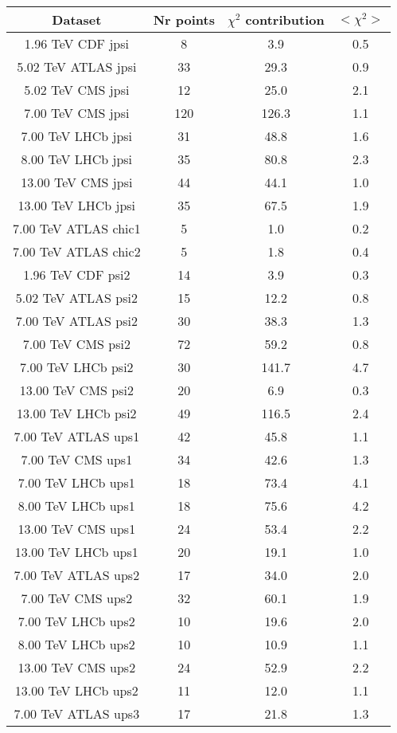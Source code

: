 \begin{table}[h!]
\centering
\begin{tabular}{c|c|c|c}
Dataset & Nr points & $\chi^2$ contribution & $<\chi^2>$ \\
\hline
1.96 TeV CDF jpsi & 8 & 3.9 & 0.5 \\
5.02 TeV ATLAS jpsi & 33 & 29.3 & 0.9 \\
5.02 TeV CMS jpsi & 12 & 25.0 & 2.1 \\
7.00 TeV CMS jpsi & 120 & 126.3 & 1.1 \\
7.00 TeV LHCb jpsi & 31 & 48.8 & 1.6 \\
8.00 TeV LHCb jpsi & 35 & 80.8 & 2.3 \\
13.00 TeV CMS jpsi & 44 & 44.1 & 1.0 \\
13.00 TeV LHCb jpsi & 35 & 67.5 & 1.9 \\
7.00 TeV ATLAS chic1 & 5 & 1.0 & 0.2 \\
7.00 TeV ATLAS chic2 & 5 & 1.8 & 0.4 \\
1.96 TeV CDF psi2 & 14 & 3.9 & 0.3 \\
5.02 TeV ATLAS psi2 & 15 & 12.2 & 0.8 \\
7.00 TeV ATLAS psi2 & 30 & 38.3 & 1.3 \\
7.00 TeV CMS psi2 & 72 & 59.2 & 0.8 \\
7.00 TeV LHCb psi2 & 30 & 141.7 & 4.7 \\
13.00 TeV CMS psi2 & 20 & 6.9 & 0.3 \\
13.00 TeV LHCb psi2 & 49 & 116.5 & 2.4 \\
7.00 TeV ATLAS ups1 & 42 & 45.8 & 1.1 \\
7.00 TeV CMS ups1 & 34 & 42.6 & 1.3 \\
7.00 TeV LHCb ups1 & 18 & 73.4 & 4.1 \\
8.00 TeV LHCb ups1 & 18 & 75.6 & 4.2 \\
13.00 TeV CMS ups1 & 24 & 53.4 & 2.2 \\
13.00 TeV LHCb ups1 & 20 & 19.1 & 1.0 \\
7.00 TeV ATLAS ups2 & 17 & 34.0 & 2.0 \\
7.00 TeV CMS ups2 & 32 & 60.1 & 1.9 \\
7.00 TeV LHCb ups2 & 10 & 19.6 & 2.0 \\
8.00 TeV LHCb ups2 & 10 & 10.9 & 1.1 \\
13.00 TeV CMS ups2 & 24 & 52.9 & 2.2 \\
13.00 TeV LHCb ups2 & 11 & 12.0 & 1.1 \\
7.00 TeV ATLAS ups3 & 17 & 21.8 & 1.3 \\

\end{tabular}
\end{table}
